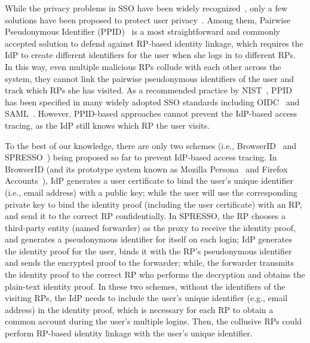 While the privacy problems in SSO have been widely recognized~\cite{maler2008venn,NIST2017draft}, only a few solutions have been proposed to protect user privacy~\cite{persona,SPRESSO}. Among them, Pairwise Pseudonymous Identifier (PPID)~\cite{OpenIDConnect, SAMLIdentifier} is a most straightforward and commonly accepted solution to defend against RP-based identity linkage, which requires the IdP to create different identifiers for the user when she logs in to different RPs. In this way, even multiple malicious RPs collude with each other across the system, they cannot link the  pairwise pseudonymous identifiers of the user and track which RPs she has visited. As a recommended practice by NIST~\cite{NIST2017draft}, PPID has been specified in many widely adopted SSO standards including OIDC~\cite{OpenIDConnect} and SAML~\cite{SAMLIdentifier}.
However, PPID-based approaches cannot prevent the IdP-based access tracing, as the IdP still knows which RP the user visits. %

To the best of our knowledge, there are only two schemes (i.e., BrowserID~\cite{BrowserID} and SPRESSO~\cite{SPRESSO}) being proposed so far to prevent IdP-based access tracing.
In BrowserID (and its prototype system known as Mozilla Persona~\cite{persona} and Firefox Accounts~\cite{FirefoxAccount}),
 IdP generates a user certificate to bind the user's unique identifier (i.e., email address) with a public key;
 while the user will use the corresponding private key to bind the identity proof (including the user certificate) with an RP, and send it to the correct RP confidentially.
In SPRESSO, the RP chooses a third-party entity (named forwarder) as the proxy to receive the identity proof,
 and generates a pseudonymous identifier for itself on each login;
 IdP generates the identity proof for the user,  binds it with the RP's pseudonymous identifier and sends the encrypted proof to the forwarder;
 while, the forwarder transmits the identity proof to the correct RP who performs the decryption and obtains the plain-text identity proof.
In these two schemes, without the identifiers of the visiting RPs,
the IdP needs to include the user's unique identifier (e.g., email address) in the identity proof,
 which is necessary for  each RP to  obtain a common account during the user's multiple logins.
Then, the collusive RPs could  perform RP-based identity linkage with the user's unique identifier.


